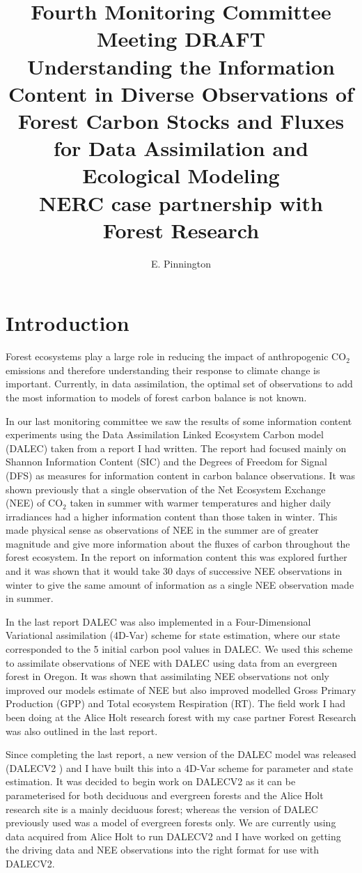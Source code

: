 \documentclass[11pt]{article}
\title{Fourth Monitoring Committee Meeting DRAFT\\\vspace{4mm} \normalsize{Understanding the Information Content in Diverse Observations of Forest Carbon Stocks and Fluxes for Data Assimilation and Ecological Modeling\\ NERC case partnership with Forest Research}}
\author{\normalsize{E. Pinnington}}
\begin{document}
\maketitle

\section{Introduction}

Forest ecosystems play a large role in reducing the impact of anthropogenic CO$_2$ emissions and therefore understanding their response to climate change is important. Currently, in data assimilation, the optimal set of observations to add the most information to models of forest carbon balance is not known.  

In our last monitoring committee we saw the results of some information content experiments using the Data Assimilation Linked Ecosystem Carbon model (DALEC) \citep{williams2005improved} taken from a report I had written. The report had focused mainly on Shannon Information Content (SIC) and the Degrees of Freedom for Signal (DFS) \citep{rodgers2000inverse} as measures for information content in carbon balance observations. It was shown previously that a single observation of the Net Ecosystem Exchange (NEE) of CO$_2$ taken in summer with warmer temperatures and higher daily irradiances had a higher information content than those taken in winter. This made physical sense as observations of NEE in the summer are of greater magnitude and give more information about the fluxes of carbon throughout the forest ecosystem. In the report on information content this was explored further and it was shown that it would take 30 days of successive NEE observations in winter to give the same amount of information as a single NEE observation made in summer.

In the last report DALEC was also implemented in a Four-Dimensional Variational assimilation (4D-Var) scheme for state estimation, where our state corresponded to the 5 initial carbon pool values in DALEC. We used this scheme to assimilate observations of NEE with DALEC using data from an evergreen forest in Oregon. It was shown that assimilating NEE observations not only improved our models estimate of NEE but also improved modelled Gross Primary Production (GPP) and Total ecosystem Respiration (RT). The field work I had been doing at the Alice Holt research forest with my case partner Forest Research was also outlined in the last report.

Since completing the last report, a new version of the DALEC model was released (DALECV2 \citep{Bloom2014}) and I have built this into a 4D-Var scheme for parameter and state estimation. It was decided to begin work on DALECV2 as it can be parameterised for both deciduous and evergreen forests and the Alice Holt research site is a mainly deciduous forest; whereas the version of DALEC previously used was a model of  evergreen forests only. We are currently using data acquired from Alice Holt to run DALECV2 and I have worked on getting the driving data and NEE observations into the right format for use with DALECV2.
\end{document}
